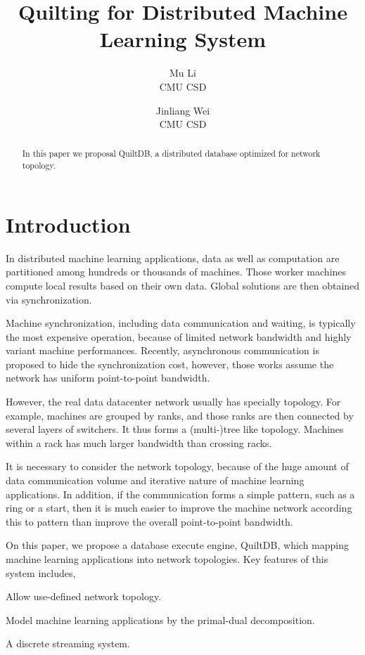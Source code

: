 \documentclass{acm_proc_article-sp}
\title{Quilting for Distributed Machine Learning System}
\author{Mu Li \\ CMU CSD \and Jinliang Wei\\ CMU CSD}
\begin{document}
\maketitle

\begin{abstract}
In this paper we proposal QuiltDB, a distributed database optimized for network
topology.
\end{abstract}

\section{Introduction}

In distributed machine learning applications, data as well as computation are
partitioned among hundreds or  thousands of machines. Those
worker machines compute local results based on their own data. Global solutions
are then obtained via synchronization.

Machine synchronization, including data communication and waiting, is typically
the most expensive operation, because of limited network bandwidth and highly
variant machine performances. Recently, asynchronous communication is proposed
to hide the synchronization cost, however, those works assume the network has
uniform point-to-point bandwidth.

However, the real data datacenter network usually has specially topology. For
example, machines are grouped by ranks, and those ranks are then connected by
several layers of switchers. It thus forms a (multi-)tree like
topology. Machines within a rack has much larger bandwidth than crossing racks.

It is necessary to consider the network topology, because of the huge amount of
data communication volume and iterative nature of  machine learning
applications. In addition, if the communication forms a simple pattern, such as
a ring or a start, then it is much easier to improve the machine network
according this to pattern than improve the overall point-to-point bandwidth.

On this paper, we propose a database execute engine, QuiltDB, which mapping
machine learning applications into network topologies. Key features of this
system includes,

\begin{itemize*}
\item Allow use-defined network topology.
\item Model machine learning applications by the primal-dual decomposition.
\item A discrete streaming system.
\end{itemize*}
\end{document}
